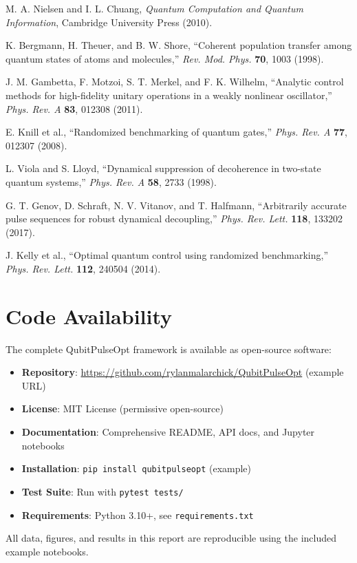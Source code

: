 \documentclass[11pt,a4paper]{article}
\theoremstyle{definition}
\theoremstyle{remark}
\begin{document}
\begin{enumerate}[label={[\arabic*]}]
    \item M. A. Nielsen and I. L. Chuang, \emph{Quantum Computation and Quantum Information}, Cambridge University Press (2010).

    \item K. Bergmann, H. Theuer, and B. W. Shore, ``Coherent population transfer among quantum states of atoms and molecules,'' \emph{Rev. Mod. Phys.} \textbf{70}, 1003 (1998).

    \item J. M. Gambetta, F. Motzoi, S. T. Merkel, and F. K. Wilhelm, ``Analytic control methods for high-fidelity unitary operations in a weakly nonlinear oscillator,'' \emph{Phys. Rev. A} \textbf{83}, 012308 (2011).

    \item E. Knill et al., ``Randomized benchmarking of quantum gates,'' \emph{Phys. Rev. A} \textbf{77}, 012307 (2008).

    \item L. Viola and S. Lloyd, ``Dynamical suppression of decoherence in two-state quantum systems,'' \emph{Phys. Rev. A} \textbf{58}, 2733 (1998).

    \item G. T. Genov, D. Schraft, N. V. Vitanov, and T. Halfmann, ``Arbitrarily accurate pulse sequences for robust dynamical decoupling,'' \emph{Phys. Rev. Lett.} \textbf{118}, 133202 (2017).

    \item J. Kelly et al., ``Optimal quantum control using randomized benchmarking,'' \emph{Phys. Rev. Lett.} \textbf{112}, 240504 (2014).
\end{enumerate}

\appendix
\section{Code Availability}

The complete QubitPulseOpt framework is available as open-source software:

\begin{itemize}
    \item \textbf{Repository}: \url{https://github.com/rylanmalarchick/QubitPulseOpt} (example URL)
    \item \textbf{License}: MIT License (permissive open-source)
    \item \textbf{Documentation}: Comprehensive README, API docs, and Jupyter notebooks
    \item \textbf{Installation}: \texttt{pip install qubitpulseopt} (example)
    \item \textbf{Test Suite}: Run with \texttt{pytest tests/}
    \item \textbf{Requirements}: Python 3.10+, see \texttt{requirements.txt}
\end{itemize}

All data, figures, and results in this report are reproducible using the included example notebooks.
\end{document}
